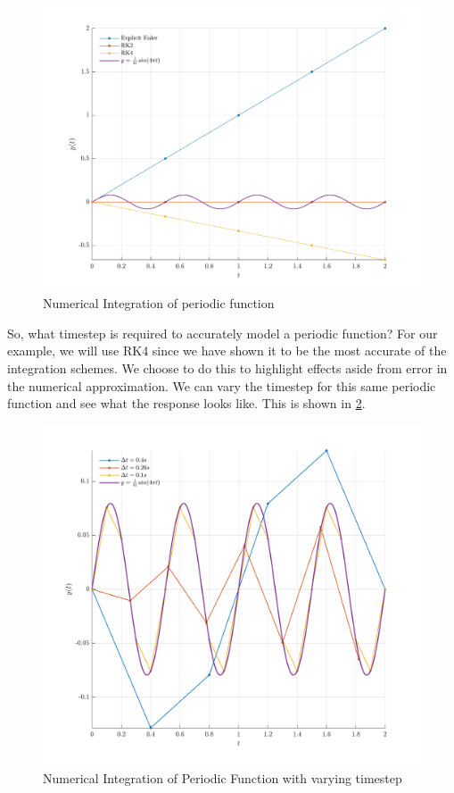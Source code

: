 \documentclass[12pt]{report}
\begin{document}
\begin{figure} [ht]
    \centering
    \includegraphics[width=\linewidth]{6DoF Explanation Scripts/Numerical Integrator Nyquist 1.png}
    \caption{Numerical Integration of periodic function}
    \label{fig:Numerical Int Periodic}
\end{figure}
So, what timestep is required to accurately model a periodic function? For our example, we will use RK4 since we have shown it to be the most accurate of the integration schemes. We choose to do this to highlight effects aside from error in the numerical approximation. We can vary the timestep for this same periodic function and see what the response looks like. This is shown in \ref{fig:Nyquist}.
\begin{figure}[ht]
    \centering
    \includegraphics[width=0.9\linewidth]{6DoF Explanation Scripts/Numerical Integrator Nyquist 2.png}
    
    \caption{Numerical Integration of Periodic Function with varying timestep}
    \label{fig:Nyquist}
\end{figure}
\end{document}
